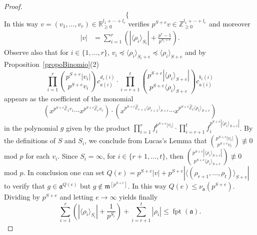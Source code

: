 \documentclass[10pt,a4paper]{amsart}
\newcommand{\E}{\mathcal{E}}
\newcommand{\RR}{\mathbb{R}}
\newcommand{\ZZ}{\mathbb{Z}}
\newcommand{\fa}{\mathfrak{a}}
\newcommand{\fpt}{{\operatorname{fpt}}}
\newcommand{\m}{\mathfrak{m}}
\begin{document}
\begin{proof}
\[\begin{cases}
\end{cases}
\] 
In this way $v =(v_1,\ldots,v_r) \in \RR_{\geq 0}^{l_1+\cdots+l_r}$ verifies $p^{S+e}v \in \ZZ_{\geq 0}^{l_1+\cdots+l_r}$ and moreover
\begin{align*}
|v|&=\sum_{i=1}^{r}\left(|\langle \rho_i \rangle_{S_i}|+\frac{p^{e}-1}{p^{S_i+e}} \right).
\end{align*}
Observe also that  for $i\in\{1,\ldots,r\}$, $v_i \preceq \langle \rho_i \rangle_{S_i+e} \preceq \langle \rho_i \rangle_{S+e}$ and by Proposition~\ref{propoBinomio}(2) 
\[\prod_{i=1}^{r}\binom{p^{S+e}|v_i|}{p^{S+e}v_i}c_{a(i)}^{d_{e}(i)} \cdot  \prod_{i=r+1}^{t}\binom{p^{S+e}|\langle \rho_i \rangle_{S+e}|}{p^{S+e}\langle \rho_i \rangle_{S+e}}c_{a(i)}^{b_{e}(i)}
\]
appears as the coefficient of the monomial 
\[(x^{p^{S+e}  \widehat{\E}_1 v_1}  \cdots  x^{p^{S+e}\widehat{\E}_r v_r})\cdot (  x^{p^{S+e}\widehat{\E}_{r+1} \langle \rho_{r+1} \rangle_{S+e}}\cdots   x^{p^{S+e}\widehat{\E}_t \langle \rho_t \rangle_{S+e} })
\]
in the polynomial $g$ given by the product 
$\prod_{i=1}^{r} f_i^{p^{S+e}|v_i|} \cdot \prod_{i =r+1}^t  f_i^{p^{S+e}|\langle \rho_i \rangle_{S+e}|}$. By the definitions of  $S$ and $S_i$, we conclude from Lucas's Lemma that $\binom{p^{S+e}|v_i|}{p^{S+e}v_i} \not \equiv 0$ mod $p$ for each $v_i$. Since $S_i=\infty$, 
for $ i \in \{r+1,\ldots, t\}$, then $\binom{p^{S+e}|\langle \rho_i \rangle_{S+e}|}{p^{S+e}\langle \rho_i \rangle_{S+e}} \not \equiv 0$ mod $p$. In conclusion one can set $Q(e)=p^{S+e} |v| +p^{S+e}|\langle( \rho_{r+1},\ldots, \rho_t) \rangle_{S+e}|$ to verify that 
$g \in  \fa^{Q(e)}$ but $g \notin \m^{[p^{S+e}]}$. In this way $Q(e)\leq \nu_{\fa}(p^{S+e})$. Dividing by $p^{S+e}$ and letting $e \rightarrow \infty$ yields finally  
\[\sum_{i=1}^{r}\left(|\langle \rho_i \rangle_{S_i}|+  \frac{1}{p^{S_i}}\right) + \sum_{i=r+1}^t|\rho_i| \leq \fpt(\fa).
\]
\end{proof}
\end{document}
